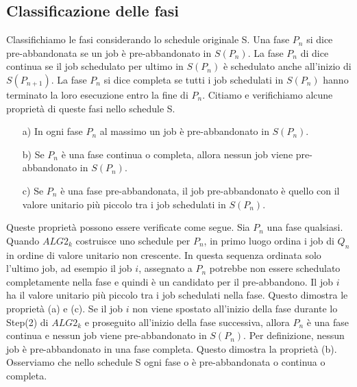 \documentclass[twoside,openany,titlepage,fleqn,
	headinclude,12pt,a4paper,BCOR5mm,footinclude]{scrbook}
\begin{document}
\subsection{Classificazione delle fasi}
Classifichiamo le fasi considerando lo schedule originale S. Una fase $P_{n}$ si dice pre-abbandonata se un job è pre-abbandonato in $S(P_{n})$. La fase $P_{n}$ di dice continua se il job schedulato per ultimo in $S(P_{n})$ è schedulato anche all'inizio di $S(P_{n + 1})$. La fase $P_{n}$ si dice completa se tutti i job schedulati in $S(P_{n})$ hanno terminato la loro esecuzione entro la fine di $P_{n}$. 
\newline Citiamo e verifichiamo alcune proprietà di queste fasi nello schedule S. 
\begin{enumerate}
\item [a)] In ogni fase $P_{n}$ al massimo un job è pre-abbandonato in $S(P_{n})$.
\item [b)] Se $P_{n}$ è una fase continua o completa, allora nessun job viene pre-abbandonato in $S(P_{n})$. 
\item [c)] Se $P_{n}$ è una fase pre-abbandonata, il job pre-abbandonato è quello con il valore unitario più piccolo tra i job schedulati in $S(P_{n})$. 
\end{enumerate}
Queste proprietà possono essere verificate come segue. Sia $P_{n}$ una fase qualsiasi. Quando $ALG2_{k}$ costruisce uno schedule per $P_{n}$, in primo luogo ordina i job di $Q_{n}$ in ordine di valore unitario non crescente. In questa sequenza ordinata solo l'ultimo job, ad esempio il job $i$, assegnato a $P_{n}$ potrebbe non essere schedulato completamente nella fase e quindi è un candidato per il pre-abbandono. Il job $i$ ha il valore unitario più piccolo tra i job schedulati nella fase. Questo dimostra le proprietà (a) e (c). Se il job $i$ non viene spostato all'inizio della fase durante lo Step(2) di $ALG2_{k}$ e proseguito all'inizio della fase successiva, allora $P_{n}$ è una fase continua e nessun job viene pre-abbandonato in $S(P_{n})$. Per definizione, nessun job è pre-abbandonato in una fase completa. Questo dimostra la proprietà (b). Osserviamo che nello schedule S ogni fase o è pre-abbandonata o continua o completa.
\end{document}
